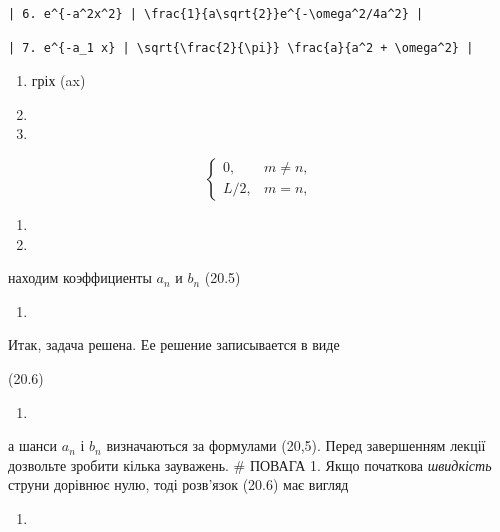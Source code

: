 \documentclass[
  ukrainian,
]{article}
\providecommand{\tightlist}{%
  \setlength{\itemsep}{0pt}\setlength{\parskip}{0pt}}
\begin{document}
\begin{verbatim}
| 6. e^{-a^2x^2} | \frac{1}{a\sqrt{2}}e^{-\omega^2/4a^2} |
\end{verbatim}

\begin{verbatim}
| 7. e^{-a_1 x} | \sqrt{\frac{2}{\pi}} \frac{a}{a^2 + \omega^2} |
\end{verbatim}

\begin{enumerate}
\def\labelenumi{\arabic{enumi}.}
\setcounter{enumi}{19}
\item
  гріх (ax)
\item
\item
\end{enumerate}

\[
\begin{cases} 0, & m \neq n, \\ L/2, & m = n, \end{cases}
\]

\begin{enumerate}
\def\labelenumi{\arabic{enumi}.}
\setcounter{enumi}{9}
\tightlist
\item
\item
\end{enumerate}

находим коэффициенты \(a_n\) и \(b_n\) (20.5)

\begin{enumerate}
\def\labelenumi{\arabic{enumi}.}
\setcounter{enumi}{11}
\tightlist
\item
\end{enumerate}

Итак, задача решена. Ее решение записывается в виде

(20.6)

\begin{enumerate}
\def\labelenumi{\arabic{enumi}.}
\setcounter{enumi}{12}
\tightlist
\item
\end{enumerate}

а шанси \(a_n\) і \(b_n\) визначаються за формулами (20,5). Перед
завершенням лекції дозвольте зробити кілька зауважень. \# ПОВАГА 1. Якщо
початкова \emph{швидкість} струни дорівнює нулю, тоді розв'язок (20.6)
має вигляд

\begin{enumerate}
\def\labelenumi{\arabic{enumi}.}
\setcounter{enumi}{13}
\tightlist
\item
\end{enumerate}
\end{document}

